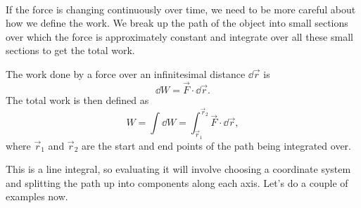 \documentclass[../classical_mechanics.tex]{subfiles}
\begin{document}
        \paragraph{}
        If the force is changing continuously over time, we need to be more careful about how we define the work.
        We break up the path of the object into small sections over which the force is approximately constant and integrate over all these small sections to get the total work.
        \begin{definition}
            The work done by a force over an infinitesimal distance $\dd{\vec{r}}$ is
            \begin{equation}
                \dd{W}=\vec{F}\cdot\dd{\vec{r}}.
            \end{equation}
            The total work is then defined as
            \begin{equation}\label{eq:work-line-integral}
                W=\int\dd{W}=\int_{\vec{r}_1}^{\vec{r}_2}\vec{F}\cdot\dd{\vec{r}},
            \end{equation}
            where $\vec{r}_1$ and $\vec{r}_2$ are the start and end points of the path being integrated over.
        \end{definition}
        This is a line integral, so evaluating it will involve choosing a coordinate system and splitting the path up into components along each axis.
        Let's do a couple of examples now.
        
\end{document}
